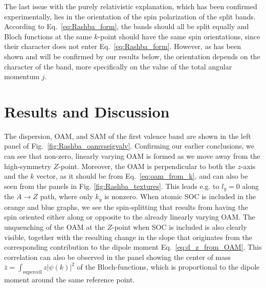 The last issue with the purely relativistic explanation, which has been confirmed experimentally\cite{Krempasky2015SurfaceSemiconductor}, lies in the orientation of the spin polarization of the split bands. According to Eq.~\ref{eq:Rashba_form}, the bands should all be split equally and Bloch functions at the same $k$-point should have the same spin orientations, since their character does not enter Eq.~\ref{eq:Rashba_form}. However, as has been shown and will be confirmed by our results below, the orientation depends on the character of the band, more specifically on the value of the total angular momentum $j$. 

\section{Results and Discussion}
The dispersion, OAM, and SAM of the first valence band are shown in the left panel of Fig.~\ref{fig:Rashba_oamvseigvalv}. Confirming our earlier conclusions, we can see that non-zero, linearly varying OAM is formed as we move away from the high-symmetry $Z$-point. Moreover, the OAM is perpendicular to both the $z$-axis and the $k$ vector, as it should be from Eq.~\ref{eq:oam_from_k}, and can also be seen from the panels in Fig. \ref{fig:Rashba_textures}. This leads e.g. to $l_y=0$ along the $A \to Z$ path, where only $k_y$ is nonzero. When atomic SOC is included in the orange and blue graphs, we see the spin-splitting that results from having the spin oriented either along or opposite to the already linearly varying OAM. The unquenching of the OAM at the $Z$-point when SOC is included is also clearly visible, together with the resulting change in the slope that originates from the corresponding contribution to the dipole moment Eq.~\ref{eq:d_z_from_OAM}. This correlation can also be observed in the panel showing the center of mass $\bar{z}=\int_{\textrm{supercell}}z |\psi(k)|^2$ of the Bloch-functions, which is proportional to the dipole moment around the same reference point.

